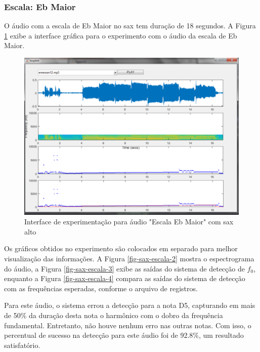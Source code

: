 \subsubsection{Escala: Eb Maior}

O áudio com a escala de Eb Maior no sax tem duração de 18 segundos. A Figura \ref{fig-sax-escala} exibe a interface gráfica para o experimento com o áudio da escala de Eb Maior.

\begin{figure}
	\centering
	\includegraphics[width=0.75\linewidth]{pasta1_figuras/sax-escala.png}
	\caption{Interface de experimentação para áudio "Escala Eb Maior" com sax alto}
	\label{fig-sax-escala}
\end{figure}

Os gráficos obtidos no experimento são colocados em separado para melhor visualização das informações. A Figura \ref{fig-sax-escala-2} mostra o espectrograma do áudio, a Figura \ref{fig-sax-escala-3} exibe as saídas do sistema de detecção de $f_0$, enquanto a Figura \ref{fig-sax-escala-4} compara as saídas do sistema de detecção com as frequências esperadas, conforme o arquivo de registros.


Para este áudio, o sistema errou a detecção para a nota D5, capturando em mais de 50\% da duração desta nota o harmônico com o dobro da frequência fundamental. Entretanto, não houve nenhum erro nas outras notas. Com isso, o percentual de sucesso na detecção para este áudio foi de 92.8\%, um resultado satisfatório.

